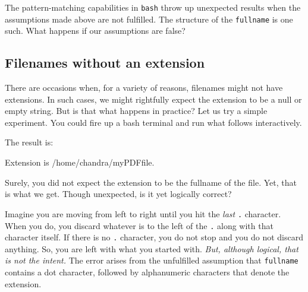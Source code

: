 \documentclass[
  a4paper,
]{article}
\newenvironment{Shaded}{\begin{snugshade}}{\end{snugshade}}
\newcommand{\AttributeTok}[1]{\textcolor[rgb]{0.80,0.80,0.80}{#1}}
\newcommand{\BuiltInTok}[1]{\textcolor[rgb]{0.80,0.80,0.80}{#1}}
\newcommand{\CommentTok}[1]{\textcolor[rgb]{0.50,0.62,0.50}{#1}}
\newcommand{\ExtensionTok}[1]{\textcolor[rgb]{0.80,0.80,0.80}{#1}}
\newcommand{\NormalTok}[1]{\textcolor[rgb]{0.80,0.80,0.80}{#1}}
\newcommand{\OperatorTok}[1]{\textcolor[rgb]{0.94,0.94,0.82}{#1}}
\newcommand{\PreprocessorTok}[1]{\textcolor[rgb]{1.00,0.81,0.69}{\textbf{#1}}}
\newcommand{\StringTok}[1]{\textcolor[rgb]{0.80,0.58,0.58}{#1}}
\newcommand{\VariableTok}[1]{\textcolor[rgb]{0.80,0.80,0.80}{#1}}
\begin{document}
The pattern-matching capabilities in \texttt{bash} throw up unexpected
results when the assumptions made above are not fulfilled. The structure
of the \texttt{fullname} is one such. What happens if our assumptions
are false?

\hypertarget{filenames-without-an-extension}{%
\subsection{Filenames without an
extension}\label{filenames-without-an-extension}}

There are occasions when, for a variety of reasons, filenames might not
have extensions. In such cases, we might rightfully expect the extension
to be a null or empty string. But is that what happens in practice? Let
us try a simple experiment. You could fire up a bash terminal and run
what follows interactively.

\begin{Shaded}
\end{Shaded}

The result is:

\begin{Shaded}
\begin{Highlighting}[]
\ExtensionTok{Extension}\NormalTok{ is /home/chandra/myPDFfile.}
\end{Highlighting}
\end{Shaded}

Surely, you did not expect the extension to be the fullname of the file.
Yet, that is what we get. Though unexpected, is it yet logically
correct?

Imagine you are moving from left to right until you hit the \emph{last}
\texttt{.} character. When you do, you discard whatever is to the left
of the \texttt{.} along with that character itself. If there is no
\texttt{.} character, you do not stop and you do not discard anything.
So, you are left with what you started with. \emph{But, although
logical, that is not the intent.} The error arises from the unfulfilled
assumption that \texttt{fullname} contains a dot character, followed by
alphanumeric characters that denote the extension.
\end{document}
